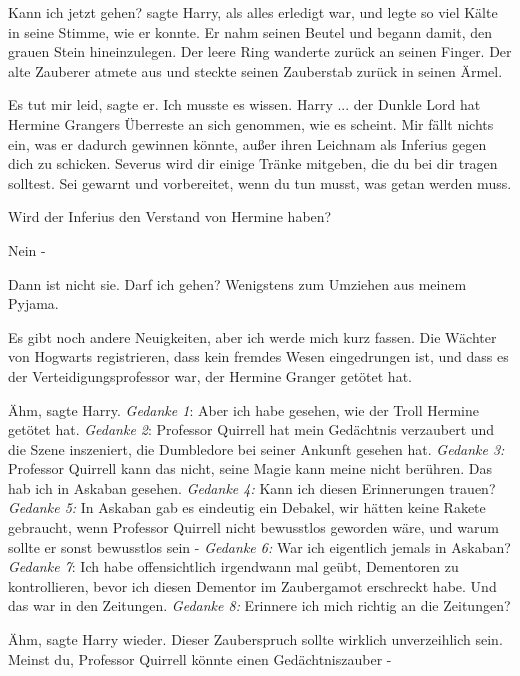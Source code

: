 \glqq Kann ich jetzt gehen?\grqq{} sagte Harry, als alles erledigt war, und
legte so viel Kälte in seine Stimme, wie er konnte. Er nahm seinen Beutel und
begann damit, den grauen Stein hineinzulegen. Der leere Ring wanderte zurück an
seinen Finger. Der alte Zauberer atmete aus und steckte seinen Zauberstab zurück
in seinen Ärmel.

\glqq Es tut mir leid\grqq{}, sagte er. \glqq Ich musste es wissen. Harry ...
der Dunkle Lord hat Hermine Grangers Überreste an sich genommen, wie es scheint.
Mir fällt nichts ein, was er dadurch gewinnen könnte, außer ihren Leichnam als
Inferius gegen dich zu schicken. Severus wird dir einige Tränke mitgeben, die du
bei dir tragen solltest. Sei gewarnt und vorbereitet, wenn du tun musst, was
getan werden muss.\grqq{}

\glqq Wird der Inferius den Verstand von Hermine haben?\grqq{}

\glqq Nein -\grqq{}

\glqq Dann ist nicht sie. Darf ich gehen? Wenigstens zum Umziehen aus meinem
Pyjama.\grqq{}

\glqq Es gibt noch andere Neuigkeiten, aber ich werde mich kurz fassen. Die
Wächter von Hogwarts registrieren, dass kein fremdes Wesen eingedrungen ist, und
dass es der Verteidigungsprofessor war, der Hermine Granger getötet hat.\grqq{}

\glqq Ähm\grqq{}, sagte Harry. \emph{Gedanke 1}: Aber ich habe gesehen, wie der
Troll Hermine getötet hat. \emph{Gedanke 2}: Professor Quirrell hat mein
Gedächtnis verzaubert und die Szene inszeniert, die Dumbledore bei seiner
Ankunft gesehen hat. \emph{Gedanke 3:} Professor Quirrell kann das nicht, seine
Magie kann meine nicht berühren. Das hab ich in Askaban gesehen. \emph{Gedanke
4:} Kann ich diesen Erinnerungen trauen? \emph{Gedanke 5:} In Askaban gab es
eindeutig ein Debakel, wir hätten keine Rakete gebraucht, wenn Professor
Quirrell nicht bewusstlos geworden wäre, und warum sollte er sonst bewusstlos
sein - \emph{Gedanke 6: }War ich eigentlich jemals in Askaban? \emph{Gedanke 7}:
Ich habe offensichtlich irgendwann mal geübt, Dementoren zu kontrollieren, bevor
ich diesen Dementor im Zaubergamot erschreckt habe. Und das war in den
Zeitungen. \emph{Gedanke 8:} Erinnere ich mich richtig an die Zeitungen?

\glqq Ähm\grqq{}, sagte Harry wieder. \glqq Dieser Zauberspruch sollte wirklich
unverzeihlich sein. Meinst du, Professor Quirrell könnte einen Gedächtniszauber
-\grqq{}

